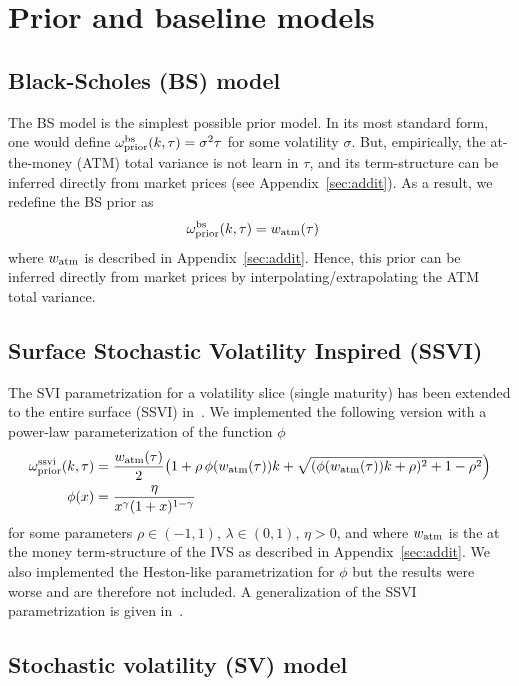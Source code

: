 \section{Prior and baseline models}\label{sec:models}

\subsection{Black-Scholes (BS) model} \label{sec:bsprior}

The BS model is the simplest possible prior model.
In its most standard form, one would define $\omega_{\rm prior}^{\rm bs}(k,\tau) = \sigma^2 \tau$ for some volatility $\sigma$.
But, empirically, the at-the-money (ATM) total variance is not learn in $\tau$, and its term-structure can be inferred directly from market prices (see Appendix~\ref{sec:addit}).
As a result, we redefine the BS prior as
\begin{align*}
\omega_{\rm prior}^{\rm bs}(k,\tau) & = w_{\rm atm}(\tau)
\end{align*}
where $w_{\rm atm}$ is described in Appendix~\ref{sec:addit}.
Hence, this prior can be inferred directly from market prices by interpolating/extrapolating the ATM total variance.

\subsection{Surface Stochastic Volatility Inspired (SSVI)} \label{sec:ssviprior}

The SVI parametrization for a volatility slice (single maturity) has been extended to the entire surface (SSVI) in~\cite{gatheral2014arbitrage}.
We implemented the following version with a power-law parameterization of the function $\phi$
\begin{align*}
\omega_{\rm prior}^{\rm ssvi}(k,\tau) & = 
\frac{w_{\rm atm}(\tau)}{2} \big(1 + \rho\, \phi(w_{\rm atm}(\tau)) k + \sqrt{(\phi(w_{\rm atm}(\tau))k + \rho)^2 + 1 - \rho^2}\Big) \\
\phi(x) & =
\frac{\eta}{x^\gamma (1 + x)^{1 - \gamma}}
\end{align*}
for some parameters $\rho\in(-1,1)$, $\lambda\in(0,1)$, $\eta>0$, and where $w_{\rm atm}$ is the at the money term-structure of the IVS as described in Appendix~\ref{sec:addit}.
We also implemented the Heston-like parametrization for $\phi$ but the results were worse and are therefore not included.
A generalization of the SSVI parametrization is given in~\cite{guo2016generalized}.

\subsection{Stochastic volatility (SV) model} \label{sec:SVJ}

